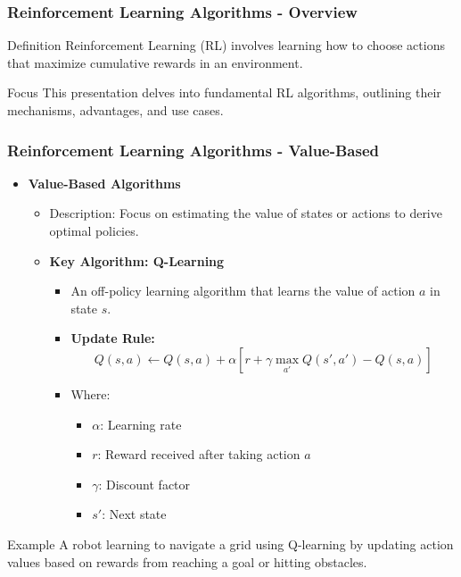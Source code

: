 \documentclass[aspectratio=169]{beamer}
\begin{document}
\begin{frame}[fragile]
    \frametitle{Reinforcement Learning Algorithms - Overview}
    \begin{block}{Definition}
        Reinforcement Learning (RL) involves learning how to choose actions that maximize cumulative rewards in an environment. 
    \end{block}
    \begin{block}{Focus}
        This presentation delves into fundamental RL algorithms, outlining their mechanisms, advantages, and use cases.
    \end{block}
\end{frame}

\begin{frame}[fragile]
    \frametitle{Reinforcement Learning Algorithms - Value-Based}
    \begin{itemize}
        \item \textbf{Value-Based Algorithms}
        \begin{itemize}
            \item Description: Focus on estimating the value of states or actions to derive optimal policies.
            \item \textbf{Key Algorithm: Q-Learning}
            \begin{itemize}
                \item An off-policy learning algorithm that learns the value of action \( a \) in state \( s \).
                \item \textbf{Update Rule:}
                \begin{equation}
                    Q(s, a) \leftarrow Q(s, a) + \alpha [r + \gamma \max_{a'} Q(s', a') - Q(s, a)]
                \end{equation}
                \item Where: 
                \begin{itemize}
                    \item \( \alpha \): Learning rate
                    \item \( r \): Reward received after taking action \( a \)
                    \item \( \gamma \): Discount factor
                    \item \( s' \): Next state
                \end{itemize}
            \end{itemize}
        \end{itemize}
    \end{itemize}
    \begin{block}{Example}
        A robot learning to navigate a grid using Q-learning by updating action values based on rewards from reaching a goal or hitting obstacles.
    \end{block}
\end{frame}
\end{document}
